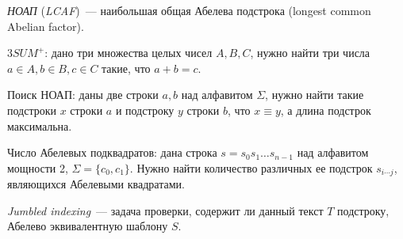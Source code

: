 \begin{definition}
\textit{НОАП} (\textit{LCAF})~--- наибольшая общая Абелева подстрока (longest common Abelian factor).
\end{definition}

\begin{problem}
$3SUM^+$: дано три множества целых чисел $A, B, C$, нужно найти три числа $a \in A, b \in B, c \in C$ такие, что $a+b=c$.
\end{problem}

\begin{problem}
Поиск НОАП: даны две строки $a, b$ над алфавитом $\Sigma$, нужно найти такие подстроки $x$ строки $a$ и подстроку $y$ строки $b$, что $x \equiv y$, а длина подстрок максимальна.
\end{problem}

\begin{problem}
Число Абелевых подквадратов: дана строка $s=s_0s_1 \ldots s_{n-1}$ над алфавитом мощности 2, $\Sigma = \{c_0, c_1\}$. Нужно найти количество различных ее подстрок $s_{i \cdots j}$, являющихся Абелевыми квадратами.
\end{problem}

\begin{problem}
\textit{Jumbled indexing}~--- задача проверки, содержит ли данный текст $T$ подстроку, Абелево эквивалентную шаблону $S$.
\end{problem}





